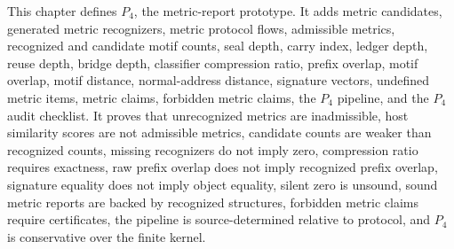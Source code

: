 \begin{remark}[Summary]
\label{rem:metric-report-summary}
This chapter defines $P_4$, the metric-report prototype. It adds metric candidates, generated metric recognizers, metric protocol flows, admissible metrics, recognized and candidate motif counts, seal depth, carry index, ledger depth, reuse depth, bridge depth, classifier compression ratio, prefix overlap, motif overlap, motif distance, normal-address distance, signature vectors, undefined metric items, metric claims, forbidden metric claims, the $P_4$ pipeline, and the $P_4$ audit checklist. It proves that unrecognized metrics are inadmissible, host similarity scores are not admissible metrics, candidate counts are weaker than recognized counts, missing recognizers do not imply zero, compression ratio requires exactness, raw prefix overlap does not imply recognized prefix overlap, signature equality does not imply object equality, silent zero is unsound, sound metric reports are backed by recognized structures, forbidden metric claims require certificates, the pipeline is source-determined relative to protocol, and $P_4$ is conservative over the finite kernel.
\end{remark}
